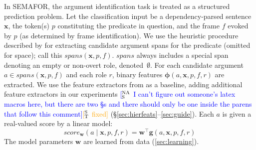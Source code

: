 \documentclass[11pt,a4paper]{article}
\newcommand{\ensuretext}[1]{#1}
\newcommand{\stmarker}{\ensuretext{\textcolor{orange}{\ensuremath{^{\textsc{S}}_{\textsc{T}}}}}}
\newcommand{\nasmarker}{\ensuretext{\textcolor{blue}{\ensuremath{^{\textsc{NA}}_{\textsc{S}}}}}}
\newcommand{\arkcomment}[3]{\ensuretext{\textcolor{#3}{[#1 #2]}}}
\newcommand{\st}[1]{\arkcomment{\stmarker}{#1}{orange}}
\newcommand{\nascomment}[1]{\arkcomment{\nasmarker}{#1}{blue}}
\begin{document}
In SEMAFOR, the argument identification task is treated as a structured
prediction problem.
Let the classification input be a dependency-parsed sentence $\mathbf{x}$, 
the token(s) $p$ constituting the predicate in question, and the frame $f$ evoked by $p$
(as determined by frame identification). 
We use the heuristic procedure described by \citep{das-14} for extracting candidate argument spans 
for the predicate (omitted for space); call this $\textit{spans}(\mathbf{x}, p, f)$.
$\textit{spans}$ always includes a special span denoting an empty or non-overt
role, denoted~$\emptyset$.
For each candidate argument $a \in \textit{spans}(\mathbf{x}, p, f)$
and each role
$r$, binary features $\mathbf{\phi}(a, \mathbf{x}, p, f, r)$ are extracted.
We use the feature extractors from \citep{das-14} as a baseline, adding
additional feature extractors in our experiments \nascomment{I can't
  figure out someone's latex macros here, but there are two \S s and
  there should only be one inside the parens that follow this comment}\st{fixed}
(\S\ref{sec:hierfeats}--\ref{sec:guide}). %
Each $a$ is given a real-valued score by a linear model:
\begin{equation}\label{eq:score}
\textit{score}_\mathbf{w}(a \mid \mathbf{x}, p, f, r) = \mathbf{w}^\top \mathbf{g}(a, \mathbf{x}, p, f, r)
\end{equation}
The model parameters $\mathbf{w}$ are learned from 
data (\cref{sec:learning}).

\end{document}

